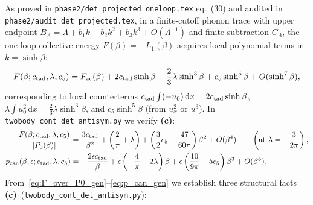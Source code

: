 \documentclass[11pt,a4paper]{article}
\newcommand{\Lc}{\textbf{(c)}}
\newcommand{\script}[1]{\texttt{#1}}
\newcommand{\dd}{\mathrm{d}}
\begin{document}
As proved in \texttt{phase2/det\_projected\_oneloop.tex} eq.~(30) and audited in \texttt{phase2/audit\_det\_projected.tex}, in a finite-cutoff phonon trace with upper endpoint $B_\Lambda=\Lambda+b_1 k+b_2 k^2+b_3 k^3+O(\Lambda^{-1})$ and finite subtraction $C_\Lambda$, the one-loop collective energy $F(\beta)=-L_1(\beta)$ acquires local polynomial terms in $k=\sinh\beta$:
\begin{equation}\label{eq:F_gen}
F(\beta;c_{\rm tad},\lambda,c_5)=F_{\rm ac}(\beta)+2c_{\rm tad}\sinh\beta+\frac23\lambda\sinh^3\beta+c_5\sinh^5\beta+O(\sinh^7\beta),
\end{equation}
corresponding to local counterterms $c_{\rm tad}\int(-u_0)\,\dd x=2c_{\rm tad}\sinh\beta$, $\lambda\int u_0^2\,\dd x=\frac23\lambda\sinh^3\beta$, and $c_5\sinh^5\beta$ (from $u_x^2$ or $u^3$). In \script{twobody\_cont\_det\_antisym.py} we verify \Lc:
\begin{align}
\frac{F(\beta;c_{\rm tad},\lambda,c_5)}{|P_0(\beta)|}
&=\frac{3c_{\rm tad}}{\beta^2}+\left(\frac{2}{\pi}+\lambda\right)+\left(\frac32 c_5-\frac{47}{60\pi}\right)\beta^2+O(\beta^4)\qquad\left(\text{at }\lambda=-\frac{3}{2\pi}\right),\label{eq:F_over_P0_gen}\\
p_{\rm can}(\beta,\epsilon;c_{\rm tad},\lambda,c_5)
&=-\frac{2\epsilon c_{\rm tad}}{\beta}+\epsilon\left(-\frac{4}{\pi}-2\lambda\right)\beta+\epsilon\left(\frac{10}{9\pi}-5c_5\right)\beta^3+O(\beta^5).\label{eq:p_can_gen}
\end{align}
From~\eqref{eq:F_over_P0_gen}--\eqref{eq:p_can_gen} we establish three structural facts \Lc\ (\script{twobody\_cont\_det\_antisym.py}):
\end{document}
